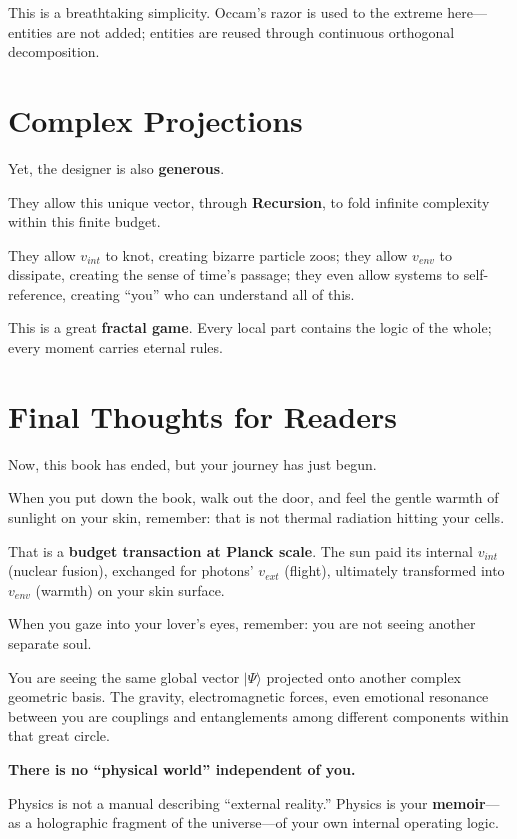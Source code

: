 This is a breathtaking simplicity. Occam's razor is used to the extreme here---entities are not added; entities are reused through continuous orthogonal decomposition.

\section*{Complex Projections}

Yet, the designer is also \textbf{generous}.

They allow this unique vector, through \textbf{Recursion}, to fold infinite complexity within this finite budget.

They allow $v_{int}$ to knot, creating bizarre particle zoos; they allow $v_{env}$ to dissipate, creating the sense of time's passage; they even allow systems to self-reference, creating ``you'' who can understand all of this.

This is a great \textbf{fractal game}. Every local part contains the logic of the whole; every moment carries eternal rules.

\section*{Final Thoughts for Readers}

Now, this book has ended, but your journey has just begun.

When you put down the book, walk out the door, and feel the gentle warmth of sunlight on your skin, remember: that is not thermal radiation hitting your cells.

That is a \textbf{budget transaction at Planck scale}. The sun paid its internal $v_{int}$ (nuclear fusion), exchanged for photons' $v_{ext}$ (flight), ultimately transformed into $v_{env}$ (warmth) on your skin surface.

When you gaze into your lover's eyes, remember: you are not seeing another separate soul.

You are seeing the same global vector $|\Psi\rangle$ projected onto another complex geometric basis. The gravity, electromagnetic forces, even emotional resonance between you are couplings and entanglements among different components within that great circle.

\textbf{There is no ``physical world'' independent of you.}

Physics is not a manual describing ``external reality.'' Physics is your \textbf{memoir}---as a holographic fragment of the universe---of your own internal operating logic.


